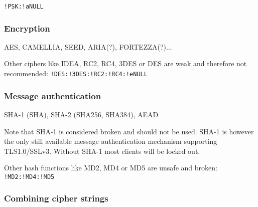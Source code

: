 \texttt{!PSK:!aNULL}

\subsubsection{Encryption}

AES, CAMELLIA, SEED, ARIA(?), FORTEZZA(?)...

Other ciphers like IDEA, RC2, RC4, 3DES or DES are weak and therefore not recommended:
\texttt{!DES:!3DES:!RC2:!RC4:!eNULL}

\subsubsection{Message authentication}

SHA-1 (SHA), SHA-2 (SHA256, SHA384), AEAD

Note that SHA-1 is considered broken and should not be used. SHA-1 is however the
only still available message authentication mechanism supporting TLS1.0/SSLv3. Without
SHA-1 most clients will be locked out.

Other hash functions like MD2, MD4 or MD5 are unsafe and broken: \texttt{!MD2:!MD4:!MD5}

\subsubsection{Combining cipher strings}


